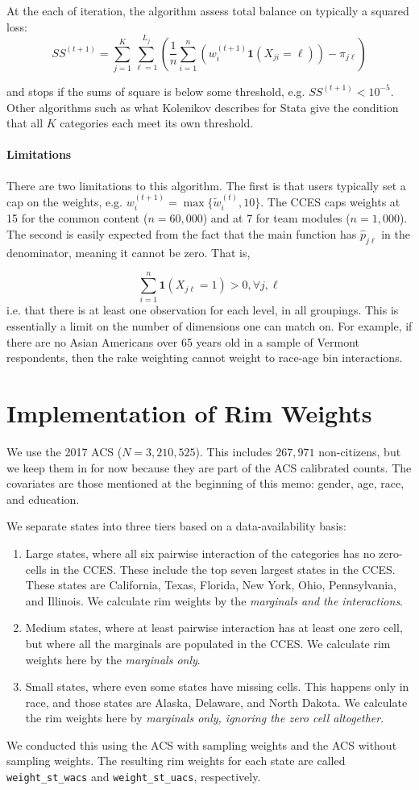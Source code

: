 \documentclass[11pt]{article}
\begin{document}
At the each of iteration, the algorithm assess total balance on typically a  squared loss:
\[SS^{(t+1)} = \sum^K_{j=1}\sum^{L_{j}}_{\ell = 1}\left(\frac{1}{n}\sum^n_{i=1}(w_i^{(t+1)}\mathbf{1}(X_{ji} = \ell)) - \pi_{j\ell}\right)\]

and stops if the sums of square is below some threshold, e.g. \(SS^{(t+1)} < 10^{-5}.\) Other algorithms such as what Kolenikov describes for Stata give the condition that all \(K\) categories each meet its own threshold.


\paragraph{Limitations}
There are two limitations to this algorithm. The first is that users typically set a cap on the weights, e.g. \(w_{i}^{(t+1)} = \max\{\tilde w^{(t)}_{i}, 10\}\). The CCES caps weights at 15 for the common content (\(n = 60,000\)) and at 7 for team modules (\(n = 1,000\)). The second is easily expected from the fact that the main function has \(\widehat{p}_{j\ell}\) in the denominator, meaning it cannot be zero. That is, 

\[\sum^n_{i=1}\mathbf{1}(X_{j\ell} = 1) > 0, \forall j, \ell\]
i.e. that there is at least one observation for each level, in all groupings. This is essentially a limit on the number of dimensions one can match on. For example, if there are no Asian Americans over 65 years old in a sample of Vermont respondents, then the rake weighting cannot weight to race-age bin interactions.

\section{Implementation of Rim Weights}

We use the 2017 ACS (\(N = 3,210,525\)). This includes \(267,971\) non-citizens, but we keep them in for now because they are part of the ACS calibrated counts. The covariates are those mentioned at the beginning of this memo: gender, age, race, and education.


We separate states into three tiers based on a data-availability basis:
\begin{enumerate}
    \item Large states, where all six pairwise interaction of the categories has no zero-cells in the CCES. These include the top seven largest states in the CCES. These states are California, Texas, Florida, New York, Ohio, Pennsylvania, and Illinois. We calculate rim weights by the \emph{marginals and the interactions}.
    \item Medium states, where at least pairwise interaction has at least one zero cell, but where all the marginals are populated in the CCES. We calculate rim weights here by the \emph{marginals only}.
    \item Small states, where even some states have missing cells. This happens only in race, and those states are Alaska, Delaware, and North Dakota. We calculate the rim weights here by \emph{marginals only, ignoring the zero cell altogether}.
\end{enumerate}


We conducted this using the ACS with sampling weights and the ACS without sampling weights. The resulting rim weights for each state are called \texttt{weight\_st\_wacs} and \texttt{weight\_st\_uacs}, respectively.
\end{document}
